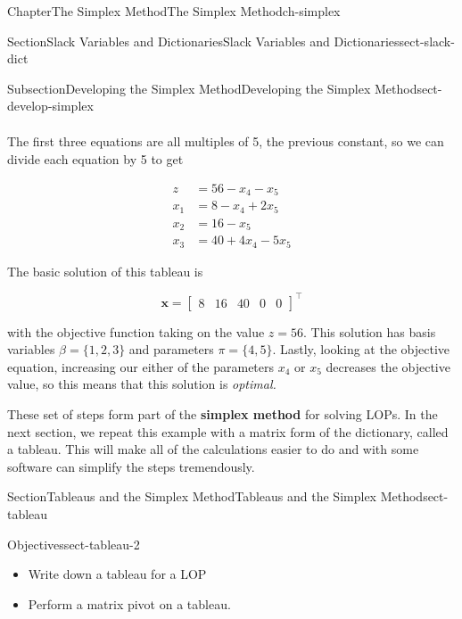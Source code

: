 \documentclass[oneside,10pt,]{book}
\newcommand{\terminology}[1]{\textbf{#1}}
\numberwithin{equation}{section}
\newcommand{\amp}{&}
\begin{document}
\begin{chapterptx}{Chapter}{The Simplex Method}{}{The Simplex Method}{}{}{ch-simplex}
\begin{sectionptx}{Section}{Slack Variables and Dictionaries}{}{Slack Variables and Dictionaries}{}{}{sect-slack-dict}
\begin{subsectionptx}{Subsection}{Developing the Simplex Method}{}{Developing the Simplex Method}{}{}{sect-develop-simplex}
\begin{align*}
\end{align*}
%
\par
The first three equations are all multiples of 5, the previous constant, so we can divide each equation by 5 to get%
\par
%
\begin{equation}
\begin{aligned} z \amp = 56 - x_4 - x_5 \\ x_1 \amp = 8 - x_4 + 2 x_5 \\ x_2 \amp = 16 - x_5  \\ x_3 \amp = 40+4x_4-5x_5 \end{aligned}\label{eq-dict-LOP1-step4}
\end{equation}
%
\par
The basic solution of this tableau is%
\par
%
\begin{equation*}
\boldsymbol{x} = \left[\begin{array}{rr|rrr} 8 \amp 16 \amp 40 \amp 0 \amp 0 \end{array} \right]^{\intercal}
\end{equation*}
%
\par
with the objective function taking on the value \(z=56\).  This solution has basis variables \(\beta=\{1,2,3\}\) and parameters \(\pi=\{4,5\}.\) Lastly, looking at the objective equation, increasing our either of the parameters \(x_4\) or \(x_5\) decreases the objective value, so this means that this solution is \emph{optimal.}%
\par
These set of steps form part of the \terminology{simplex method} for solving LOPs. In the next section, we repeat this example with a matrix form of the dictionary, called a tableau. This will make all of the calculations easier to do and with some software can simplify the steps tremendously.%
\end{subsectionptx}
\end{sectionptx}
%
%
\typeout{************************************************}
\typeout{************************************************}
%
\begin{sectionptx}{Section}{Tableaus and the Simplex Method}{}{Tableaus and the Simplex Method}{}{}{sect-tableau}
\begin{objectives}{Objectives}{sect-tableau-2}
%
\begin{itemize}[label=\textbullet]
\item{}Write down a tableau for a LOP%
\item{}Perform a matrix pivot on a tableau.%

\end{itemize}
\end{objectives}
\end{sectionptx}
\end{chapterptx}
\end{document}
